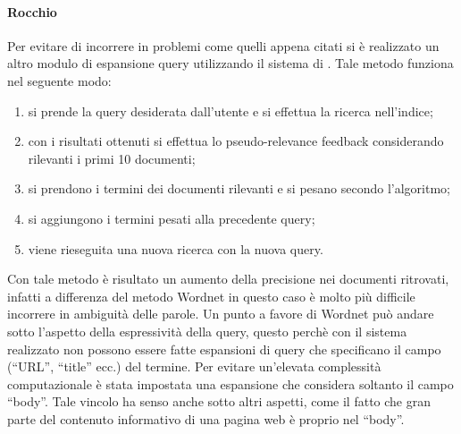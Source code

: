 \paragraph{Rocchio}
Per evitare di incorrere in problemi come quelli appena citati si è realizzato un altro modulo di espansione query utilizzando il sistema di . Tale metodo funziona nel seguente modo:
\begin{enumerate}
\item si prende la query desiderata dall'utente e si effettua la ricerca nell'indice;
\item con i risultati ottenuti si effettua lo pseudo-relevance feedback considerando rilevanti i primi 10 documenti;
\item si prendono i termini dei documenti rilevanti e si pesano secondo l'algoritmo;
\item si aggiungono i termini pesati alla precedente query;
\item viene rieseguita una nuova ricerca con la nuova query.
\end{enumerate}
Con tale metodo è risultato un aumento della precisione nei documenti ritrovati, infatti a differenza del metodo Wordnet in questo caso è molto più difficile incorrere in ambiguità delle parole. Un punto a favore di Wordnet può andare sotto l'aspetto della espressività della query, questo perchè con il sistema  realizzato non possono essere fatte espansioni di query che specificano il campo (``URL'', ``title'' ecc.) del termine. Per evitare un'elevata complessità computazionale è stata impostata una espansione che considera soltanto il campo ``body''. Tale vincolo ha senso anche sotto altri aspetti, come il fatto che gran parte del contenuto informativo di una pagina web è proprio nel ``body''.